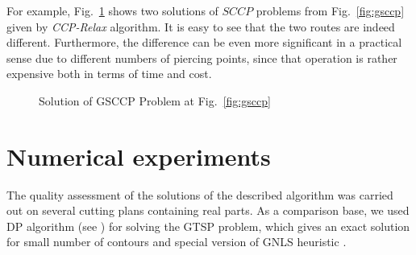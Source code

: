 \documentclass[]{llncs}
\begin{document}
For example,
Fig.~\ref{fig:gsccp-cut}
shows two solutions
of $SCCP$ problems from Fig.~\ref{fig:gsccp}
given by {\it CCP-Relax} algorithm.
It is easy to see that the two routes are indeed different.
Furthermore,
the difference can be even more significant in a practical sense
due to different numbers of piercing points,
since that operation
is rather expensive
both in terms of time and cost.

\begin{figure}
  \centering
  \caption{Solution of GSCCP Problem at Fig.~\ref{fig:gsccp}}
  \label{fig:gsccp-cut}
\end{figure}


\section{Numerical experiments}
\label{sec:calc}

The quality assessment of the solutions
of the described algorithm was carried out on several
cutting plans containing real parts.
As a comparison base, we used DP algorithm
(see \cite{bi15})
for solving the GTSP problem,
which gives an exact solution for small number of contours
and special version of GNLS heuristic \cite{GLNS}.
\end{document}
